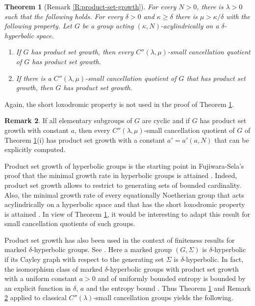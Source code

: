 \documentclass[leqno,a4paper,10pt]{amsart}
\theoremstyle{plain}
\newtheorem{thm}{Theorem}[section]
\theoremstyle{definition}
\newtheorem{rem}[thm]{Remark}
\theoremstyle{remark}
\let\ge\geqslant
\begin{document}
\begin{thm}[Remark \ref{R:product-set-growth}] \label{IT:product-set-growth} For every $N >0$, there is $\lambda>0$ such that the following holds. For every $\delta>0$ and $\kappa\ge \delta$ there is $\mu> \kappa/\delta $ with the following property. Let $G$ be a group acting $(\kappa,N)$-acylindrically on a $\delta$-hyperbolic space. 
	\begin{enumerate}[label=(\roman*)]
		\item If $G$ has product set growth, then every $C''(\lambda,\mu)$-small cancellation quotient of $G$ has product set growth. 
		\item If there is a $C''(\lambda,\mu)$-small cancellation quotient of $G$ that has product set growth, then $G$ has product set growth. 
	\end{enumerate}
\end{thm}


Again, the short loxodromic property is not used in the proof of Theorem \ref{IT:product-set-growth}. 

\begin{rem}\label{IR:product-set-growth} If all elementary subgroups of $G$ are cyclic and if $G$ has product set growth with constant $a$, then every $C''(\lambda,\mu)$-small cancellation quotient of $G$ of Theorem \ref{IT:product-set-growth}(i) has product set growth with a constant $a'=a'(a,N)$ that can be explicitly computed.
\end{rem}


Product set growth of hyperbolic groups is the starting point in Fujiwara-Sela's proof that the minimal growth rate in hyperbolic groups is attained \cite{fujiwara_rates_2020}. Indeed, product set growth allows to restrict to generating sets of bounded cardinality. Also, the minimal growth rate of every equationally Noetherian group that acts acylindrically on a hyperbolic space and that has the short loxodromic property is attained \cite{fujiwara_rates_2021}. In view of Theorem \ref{IT:product-set-growth}, it would be interesting to adapt this result for small cancellation quotients of such groups. 

 Product set growth has also been used in the context of finiteness results for marked $\delta$-hyperbolic groups. See \cite{cerochi_entropy_2021}. Here a marked group $(G,\Sigma)$ is $\delta$-hyperbolic if its Cayley graph with respect to the generating set $\Sigma$ is $\delta$-hyperbolic. In fact, the  isomorphism class of marked  $\delta$-hyperbolic groups with product set growth with a uniform constant $a>0$ and of uniformly bounded entropy is bounded by an explicit function in $\delta$, $a$ and the entropy bound \cite[Proof of Theorem 3.1]{cerochi_entropy_2021}. Thus Theorem \ref{IT:product-set-growth} and Remark \ref{IR:product-set-growth} applied to classical $C''(\lambda)$-small cancellation groups yields the following.
 
\end{document}
